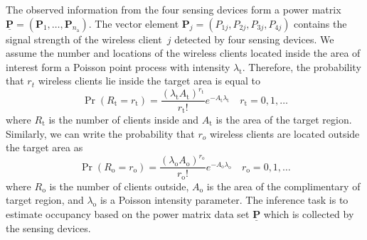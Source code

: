 The observed information from the four sensing devices form a power matrix $\underline{\mathbf{P}} = (\mathbf{P}_1, \ldots, \mathbf{P}_{n_{\mathrm{a}}})$.
The vector element $\mathbf{P}_j = (P_{1j}, P_{2j},P_{3j},P_{4j})$ contains the signal strength of the wireless client~$j$ detected by four sensing devices.
We assume the number and locations of the wireless clients located inside the area of interest form a Poisson point process with intensity $\lambda_{\mathrm{t}}$.
Therefore, the probability that $r_{t}$ wireless clients lie inside the target area is equal to
\begin{equation*}
\Pr ( R_{\mathrm{t}} = r_{\mathrm{t}} )
= \frac{(\lambda_{\mathrm{t}} A_{\mathrm{t}})^{r_{\mathrm{t}}}}
{r_{\mathrm{t}}!} e^{- A_{\mathrm{t}} \lambda_{\mathrm{t}}}
\quad r_{\mathrm{t}} = 0, 1, \ldots
\end{equation*}
where $R_{\mathrm{t}}$ is the number of clients inside and $A_{\mathrm{t}}$ is the area of the target region.
Similarly, we can write the probability that $r_{o}$ wireless clients are located outside the target area as
\begin{equation*}
\Pr ( R_{\mathrm{o}} = r_{\mathrm{o}} )
= \frac{(\lambda_{\mathrm{o}} A_{\mathrm{o}})^{r_{\mathrm{o}}}}
{r_{\mathrm{o}}!} e^{- A_{\mathrm{o}} \lambda_{\mathrm{o}}}
\quad r_{\mathrm{o}} = 0, 1, \ldots
\end{equation*}
where $R_{\mathrm{o}}$ is the number of clients outside, $A_{\mathrm{o}}$ is the area of the complimentary of target region, and $\lambda_{\mathrm{o}}$ is a Poisson intensity parameter.
The inference task is to estimate occupancy based on the power matrix data set $\underline{\mathbf{P}}$ which is collected by the sensing devices.


